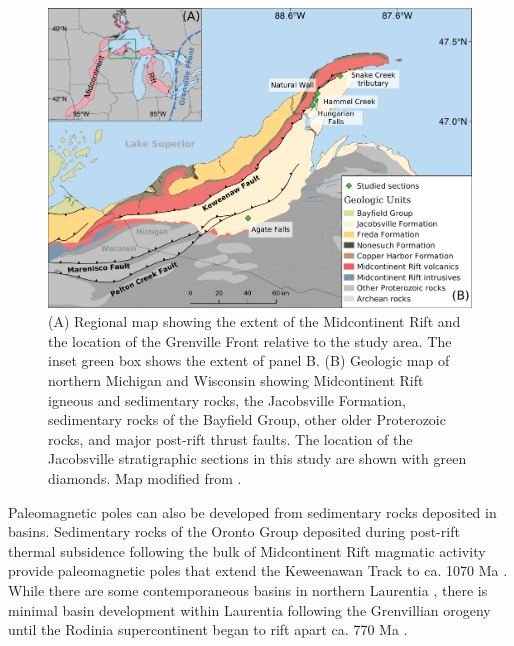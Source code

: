 \documentclass[draft]{agujournal2019}
\begin{document}
\begin{figure}[h!]
\centering
\includegraphics[width=\textwidth]{Geologic_map.pdf}
\caption{(A) Regional map showing the extent of the Midcontinent Rift and the location of the Grenville Front relative to the study area. The inset green box shows the extent of panel B. (B) Geologic map of northern Michigan and Wisconsin showing Midcontinent Rift igneous and sedimentary rocks, the Jacobsville Formation, sedimentary rocks of the Bayfield Group, other older Proterozoic rocks, and major post-rift thrust faults. The location of the Jacobsville stratigraphic sections in this study are shown with green diamonds. Map modified from .}
\label{fig:Geologic_map}
\end{figure}

Paleomagnetic poles can also be developed from sedimentary rocks deposited in basins. Sedimentary rocks of the Oronto Group deposited during post-rift thermal subsidence following the bulk of Midcontinent Rift magmatic activity provide paleomagnetic poles that extend the Keweenawan Track to ca. 1070 Ma \cite{Henry1977a, Slotznick2023a}. While there are some contemporaneous basins in northern Laurentia \cite{Greenman2021a}, there is minimal basin development within Laurentia following the Grenvillian orogeny until the Rodinia supercontinent began to rift apart ca. 770 Ma \cite{Macdonald2023a}. 
\end{document}
